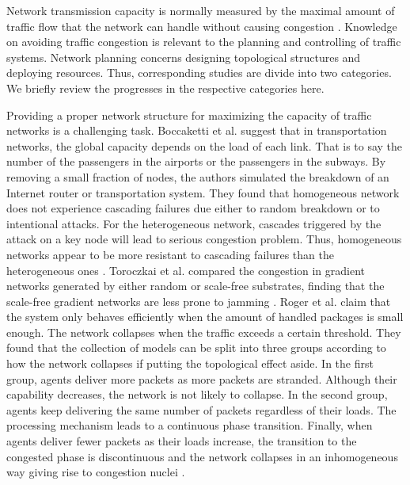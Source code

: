 \documentclass[onecolumn,preprintnumbers,amsmath,amssymb]{revtex4}
\begin{document}
Network transmission capacity is normally measured by the maximal amount of traffic flow that the network can handle without causing congestion \cite{TORS}. 
Knowledge on avoiding traffic congestion is relevant to the planning and controlling of  traffic systems.
Network planning concerns designing topological structures and deploying resources. 
Thus, corresponding studies are divide into two categories.
We briefly review the progresses in the respective categories here.

Providing a proper network structure for maximizing the capacity of traffic networks is a challenging task.
Boccaketti et al. suggest that in transportation networks, the global capacity depends on the load of each link.
That is to say the number of the passengers in the airports or the passengers in the subways. 
By removing a small fraction of nodes, the authors simulated the breakdown of an Internet router or transportation system.
They found that homogeneous network does not experience cascading failures due either to random breakdown or to intentional attacks. 
For the heterogeneous network, cascades triggered by the attack on a key node will lead to serious congestion problem.
Thus, homogeneous networks appear to be more resistant to cascading failures than the heterogeneous ones \cite{SBVV}.
Toroczkai et al. compared the congestion in gradient networks generated by either random or scale-free substrates, finding that the scale-free gradient networks are less prone to jamming \cite{ZTKE,ZTBE}.
Roger et al. claim that the system only behaves efficiently when the amount of handled packages  is small enough. 
The network collapses when the traffic exceeds a certain threshold. 
They found that the collection of models can be split into three groups according to how the network collapses if putting the topological effect aside. 
In the first group, agents deliver more packets as more packets are stranded.
Although their capability decreases, the network is not likely to collapse. 
In the second group, agents keep delivering the same number of packets regardless of their loads. 
The processing mechanism leads to a continuous phase transition. 
Finally, when agents deliver fewer packets as their loads increase, the transition to the congested phase is discontinuous and the network collapses in an inhomogeneous way giving rise to congestion nuclei \cite{RGA}.
\end{document}
